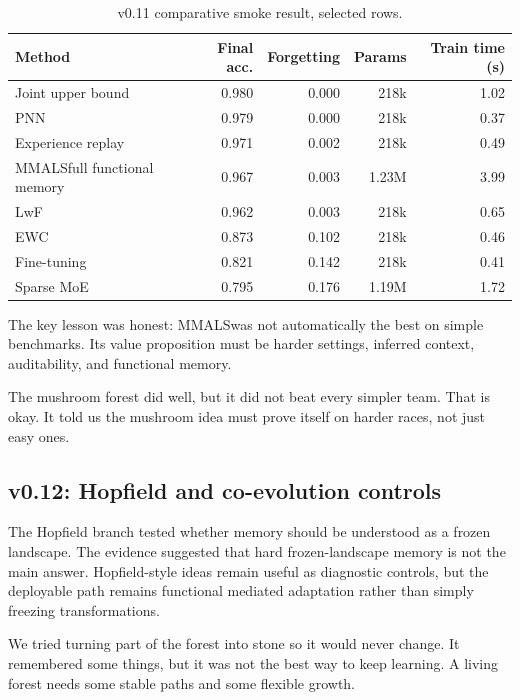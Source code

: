 \documentclass[11pt]{article}
\newcommand{\mmals}{\textsc{MMALS}}
\begin{document}
\begin{table}[h]
\centering
\caption{v0.11 comparative smoke result, selected rows.}
\begin{tabular}{lrrrr}
\toprule
Method & Final acc. & Forgetting & Params & Train time (s) \\
\midrule
Joint upper bound & 0.980 & 0.000 & 218k & 1.02 \\
PNN & 0.979 & 0.000 & 218k & 0.37 \\
Experience replay & 0.971 & 0.002 & 218k & 0.49 \\
\mmals full functional memory & 0.967 & 0.003 & 1.23M & 3.99 \\
LwF & 0.962 & 0.003 & 218k & 0.65 \\
EWC & 0.873 & 0.102 & 218k & 0.46 \\
Fine-tuning & 0.821 & 0.142 & 218k & 0.41 \\
Sparse MoE & 0.795 & 0.176 & 1.19M & 1.72 \\
\bottomrule
\end{tabular}
\end{table}

The key lesson was honest: \mmals was not automatically the best on simple benchmarks. Its value proposition must be harder settings, inferred context, auditability, and functional memory.

\begin{kidbox}
The mushroom forest did well, but it did not beat every simpler team. That is okay. It told us the mushroom idea must prove itself on harder races, not just easy ones.
\end{kidbox}

\subsection{v0.12: Hopfield and co-evolution controls}

The Hopfield branch tested whether memory should be understood as a frozen landscape. The evidence suggested that hard frozen-landscape memory is not the main answer. Hopfield-style ideas remain useful as diagnostic controls, but the deployable path remains functional mediated adaptation rather than simply freezing transformations.

\begin{kidbox}
We tried turning part of the forest into stone so it would never change. It remembered some things, but it was not the best way to keep learning. A living forest needs some stable paths and some flexible growth.
\end{kidbox}
\end{document}
